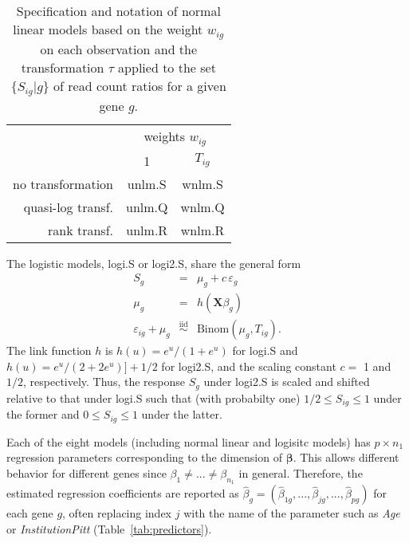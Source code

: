 \documentclass[letterpaper]{article}
\begin{document}
\begin{table}
\begin{center}
\begin{tabular}{r|cc}
 & \multicolumn{2}{c}{weights \(w_{ig}\)} \\
 & 1 & \(T_{ig}\) \\
\hline
no transformation & unlm.S & wnlm.S \\
quasi-log transf. & unlm.Q & wnlm.Q \\
rank transf. & unlm.R & wnlm.R \\
\end{tabular}
\end{center}
\caption{Specification and notation of normal linear models based on the weight
\(w_{ig}\) on each observation and the
transformation \(\tau\) applied to the set \(\{S_{ig} | g\}\) of read count
ratios for a given gene \(g\).}
\label{tab:nlm}
\end{table}

The logistic models, logi.S or logi2.S, share the general form
\begin{eqnarray}
S_g &=& \mu_g + c\, \varepsilon_g
\label{eq:logi-general}
\\
\mu_g &=& h(\mathbf{X} \beta_g) \\
\varepsilon_{ig} + \mu_g &\overset{\mathrm{iid}}{\sim}& \mathrm{Binom}(\mu_g, T_{ig}).
\label{eq:binom-error}
\end{eqnarray}
The link function \(h\) is \(h(u) = e^u / (1 + e^u)\) for logi.S and \(h(u) =
e^u / (2 + 2e^u)] + 1/2\) for logi2.S, and the scaling constant \(c=\) 1
 and \(1/2\), respectively.  Thus, the response \(S_g\) under logi2.S is scaled and shifted relative to
that under logi.S such that (with probabilty one) \(1/2\le S_{ig}\le 1\) under the former and
\(0\le S_{ig}\le 1\) under the latter.

Each of the eight models (including normal linear and logisitc models) has \(p\times n_1\) regression parameters corresponding to the
dimension of \(\boldsymbol{\beta}\).  This allows different behavior for
different genes since \(\beta_1\neq ...\neq\beta_{n_1}\) in general.
Therefore, the estimated regression coefficients are reported as \(\hat{\beta}_g =
(\hat{\beta}_{1g},...,\hat{\beta}_{jg},...,\hat{\beta}_{pg})\) for each gene \(g\), often
replacing index \(j\) with the name of the parameter such as \emph{Age} or
\emph{InstitutionPitt} (Table~\ref{tab:predictors}).
\end{document}
